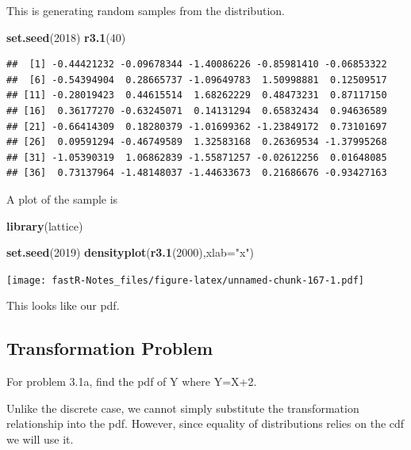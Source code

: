 \documentclass[]{book}
\newenvironment{Shaded}{\begin{snugshade}}{\end{snugshade}}
\newcommand{\KeywordTok}[1]{\textcolor[rgb]{0.13,0.29,0.53}{\textbf{#1}}}
\newcommand{\DataTypeTok}[1]{\textcolor[rgb]{0.13,0.29,0.53}{#1}}
\newcommand{\DecValTok}[1]{\textcolor[rgb]{0.00,0.00,0.81}{#1}}
\newcommand{\StringTok}[1]{\textcolor[rgb]{0.31,0.60,0.02}{#1}}
\newcommand{\NormalTok}[1]{#1}
\theoremstyle{definition}
\theoremstyle{definition}
\theoremstyle{definition}
\theoremstyle{remark}
\begin{document}
This is generating random samples from the distribution.

\begin{Shaded}
\begin{Highlighting}[]
\KeywordTok{set.seed}\NormalTok{(}\DecValTok{2018}\NormalTok{)}
\KeywordTok{r3.1}\NormalTok{(}\DecValTok{40}\NormalTok{)}
\end{Highlighting}
\end{Shaded}

\begin{verbatim}
##  [1] -0.44421232 -0.09678344 -1.40086226 -0.85981410 -0.06853322
##  [6] -0.54394904  0.28665737 -1.09649783  1.50998881  0.12509517
## [11] -0.28019423  0.44615514  1.68262229  0.48473231  0.87117150
## [16]  0.36177270 -0.63245071  0.14131294  0.65832434  0.94636589
## [21] -0.66414309  0.18280379 -1.01699362 -1.23849172  0.73101697
## [26]  0.09591294 -0.46749589  1.32583168  0.26369534 -1.37995268
## [31] -1.05390319  1.06862839 -1.55871257 -0.02612256  0.01648085
## [36]  0.73137964 -1.48148037 -1.44633673  0.21686676 -0.93427163
\end{verbatim}

A plot of the sample is

\begin{Shaded}
\begin{Highlighting}[]
\KeywordTok{library}\NormalTok{(lattice)}
\end{Highlighting}
\end{Shaded}

\begin{Shaded}
\begin{Highlighting}[]
\KeywordTok{set.seed}\NormalTok{(}\DecValTok{2019}\NormalTok{)}
\KeywordTok{densityplot}\NormalTok{(}\KeywordTok{r3.1}\NormalTok{(}\DecValTok{2000}\NormalTok{),}\DataTypeTok{xlab=}\StringTok{"x"}\NormalTok{)}
\end{Highlighting}
\end{Shaded}

\texttt{[image: fastR-Notes\_files/figure-latex/unnamed-chunk-167-1.pdf]}

This looks like our pdf.

\subsection{Transformation Problem}\label{transformation-problem}

For problem 3.1a, find the pdf of Y where Y=X+2.

Unlike the discrete case, we cannot simply substitute the transformation
relationship into the pdf. However, since equality of distributions
relies on the cdf we will use it.
\end{document}
